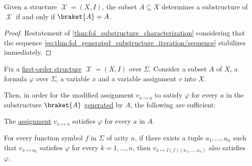 \begin{corollary}\label{thm:generated_substructure_coincides}
  Given a structure \( \mscrX = (X, I) \), the subset \( A \subseteq X \) determines a substructure of \( \mscrX \) if and only if \( \braket{ A } = A \).
\end{corollary}
\begin{proof}
  Restatement of \cref{thm:fol_substructure_characterization} considering that the sequence \eqref{eq:thm:fol_generated_substructure_iteration/sequence} stabilizes immediately.
\end{proof}

\begin{theorem}\label{thm:induction_on_generated_substructures}
  Fix a \hyperref[def:fol_structure]{first-order structure} \( \mscrX = (X, I) \) over \( \Sigma \). Consider a subset \( A \) of \( X \), a formula \( \varphi \) over \( \Sigma \), a variable \( x \) and a variable assignment \( v \) into \( X \).

  Then, in order for the modified assignment \( v_{x \mapsto a} \) to satisfy \( \varphi \) for every \( a \) in the substructure \( \braket{ A } \) \hyperref[def:fol_generated_substructure]{generated} by \( A \), the following are sufficient:
  \begin{thmenum}
     The \hyperref[def:fol_semantics/satisfaction]{assignment} \( v_{x \mapsto a} \) satisfies \( \varphi \) for every \( a \) in \( A \).

     For every function symbol \( f \) in \( \Sigma \) of arity \( n \), if there exists a tuple \( a_1, \ldots, a_n \) such that \( v_{x \mapsto a_k} \) satisfies \( \varphi \) for every \( k = 1, \ldots, n \), then \( v_{x \mapsto I(f)(x_1, \ldots, x_n)} \) also satisfies \( \varphi \).
  \end{thmenum}
\end{theorem}
